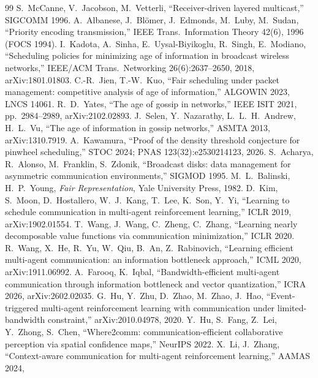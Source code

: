 \documentclass[11pt]{article}
\theoremstyle{definition}
\begin{document}
\begin{thebibliography}{99}\small
{} S.~McCanne, V.~Jacobson, M.~Vetterli, ``Receiver-driven layered multicast,'' SIGCOMM 1996.
 A.~Albanese, J.~Bl\"omer, J.~Edmonds, M.~Luby, M.~Sudan, ``Priority encoding transmission,'' IEEE Trans.\
Information Theory 42(6), 1996 (FOCS 1994).
 I.~Kadota, A.~Sinha, E.~Uysal-Biyikoglu, R.~Singh, E.~Modiano, ``Scheduling policies for minimizing
age of information in broadcast wireless networks,'' IEEE/ACM Trans.\ Networking 26(6):2637--2650, 2018, arXiv:1801.01803.
\bibitem{jien2023} C.-R.~Jien, T.-W.~Kuo, ``Fair scheduling under packet management: competitive analysis of age of
information,'' ALGOWIN 2023, LNCS 14061.
 R.~D.~Yates, ``The age of gossip in networks,'' IEEE ISIT 2021, pp.\ 2984--2989, arXiv:2102.02893.
\bibitem{selen2013} J.~Selen, Y.~Nazarathy, L.~L.~H.~Andrew, H.~L.~Vu, ``The age of information in gossip networks,''
ASMTA 2013, arXiv:1310.7919.
 A.~Kawamura, ``Proof of the density threshold conjecture for pinwheel scheduling,'' STOC 2024;
PNAS 123(32):e2530214123, 2026.
 S.~Acharya, R.~Alonso, M.~Franklin, S.~Zdonik, ``Broadcast disks: data management for
asymmetric communication environments,'' SIGMOD 1995.
 M.~L.~Balinski, H.~P.~Young, \emph{Fair Representation}, Yale University Press, 1982.
\bibitem{schednet} D.~Kim, S.~Moon, D.~Hostallero, W.~J.~Kang, T.~Lee, K.~Son, Y.~Yi, ``Learning to schedule
communication in multi-agent reinforcement learning,'' ICLR 2019, arXiv:1902.01554.
\bibitem{ndq} T.~Wang, J.~Wang, C.~Zheng, C.~Zhang, ``Learning nearly decomposable value functions via communication
minimization,'' ICLR 2020.
 R.~Wang, X.~He, R.~Yu, W.~Qiu, B.~An, Z.~Rabinovich, ``Learning efficient multi-agent communication: an
information bottleneck approach,'' ICML 2020, arXiv:1911.06992.
 A.~Farooq, K.~Iqbal, ``Bandwidth-efficient multi-agent communication through information bottleneck and
vector quantization,'' ICRA 2026, arXiv:2602.02035.
 G.~Hu, Y.~Zhu, D.~Zhao, M.~Zhao, J.~Hao, ``Event-triggered multi-agent reinforcement learning with
communication under limited-bandwidth constraint,'' arXiv:2010.04978, 2020.
\bibitem{where2comm} Y.~Hu, S.~Fang, Z.~Lei, Y.~Zhong, S.~Chen, ``Where2comm: communication-efficient collaborative
perception via spatial confidence maps,'' NeurIPS 2022.
 X.~Li, J.~Zhang, ``Context-aware communication for multi-agent reinforcement learning,'' AAMAS 2024,

\end{thebibliography}
\end{document}
